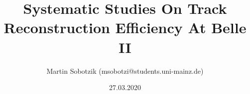 \documentclass[8pt]{beamer}
\title{{\myfont Systematic Studies On Track Reconstruction Efficiency At Belle II}}
\date{27.03.2020}
\author{Martin Sobotzik (msobotzi@students.uni-mainz.de)}
\institute{Johannes Gutenberg-Universit\"at Mainz}
\begin{document}
	
\begin{frame}[noframenumbering]
	\titlepage


	
\end{frame}



	
	



%


\newcommand{\boundellipse}[3]%
{(#1) ellipse (#2 and #3)
}

\end{document}
